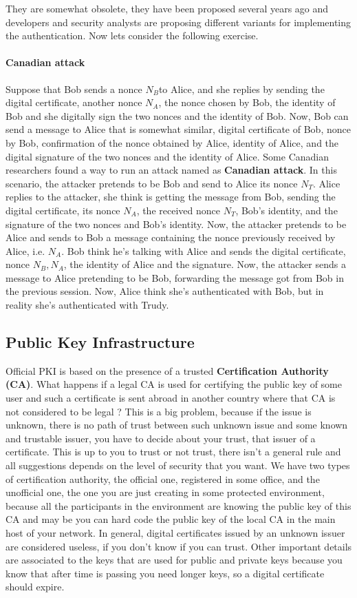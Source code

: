 \documentclass[11pt]{article}
\begin{document}
They are somewhat obsolete, they have been proposed several years ago and developers and security analysts are proposing different variants for implementing the authentication. Now lets consider the following exercise. \paragraph{Canadian attack} Suppose that Bob sends a nonce $N_B$to Alice, and she replies by sending the digital certificate, another nonce $N_A$, the nonce chosen by Bob, the identity of Bob and she digitally sign the two nonces and the identity of Bob. Now, Bob can send a message to Alice that is somewhat similar, digital certificate of Bob, nonce by Bob, confirmation of the nonce obtained by Alice, identity of Alice, and the digital signature of the two nonces and the identity of Alice. Some Canadian researchers found a way to run an attack named as \textbf{Canadian attack}. In this scenario, the attacker pretends to be Bob and send to Alice its nonce $N_T$. Alice replies to the attacker, she think is getting the message from Bob, sending the digital certificate, its nonce $N_A$, the received nonce $N_T$, Bob's identity, and the signature of the two nonces and Bob's identity. Now, the attacker pretends to be Alice and sends to Bob a message containing the nonce previously received by Alice, i.e. $N_A$. Bob think he's talking with Alice and sends the digital certificate, nonce $N_B, N_A$, the identity of Alice and the signature. Now, the attacker sends a message to Alice pretending to be Bob, forwarding the message got from Bob in the previous session. Now, Alice think she's authenticated with Bob, but in reality she's authenticated with Trudy.
\subsection{Public Key Infrastructure}
Official PKI is based on the presence of a trusted \textbf{Certification Authority (CA)}. What happens if a legal CA is used for certifying the public key of some user and such a certificate is sent abroad in another country where that CA is not considered to be legal ?  This is a big problem, because if the issue is unknown, there is no path of trust between such unknown issue and some known and trustable issuer, you have to decide about your trust, that issuer of a certificate. This is up to you to trust or not trust, there isn't a general rule and all suggestions depends on the level of security that you want. We have two types of certification authority, the official one, registered in some office, and the unofficial one, the one you are just creating in some protected environment, because all the participants in the environment are knowing the public key of this CA and may be you can hard code the public key of the local CA in the main host of your network. In general, digital certificates issued by an unknown issuer are considered useless, if you don't know if you can trust. Other important details are associated to the keys that are used for public and private keys because you know that after time is passing you need longer keys, so a digital certificate should expire.
\end{document}
